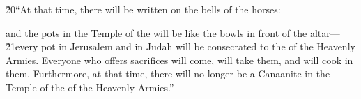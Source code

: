 \v{20}``At that time, there will be written on the bells of the horses:


and the pots in the Temple of the  will be like the bowls in front of the altar---\v{21}every pot in Jerusalem and in Judah will be consecrated to the  of the Heavenly Armies. Everyone who offers sacrifices will come, will take them, and will cook in them. Furthermore, at that time, there will no longer be a Canaanite in the Temple of the  of the Heavenly Armies.''
